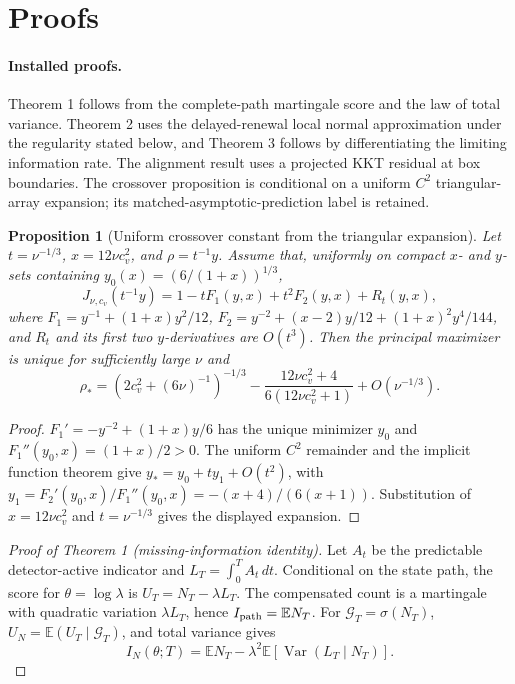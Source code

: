 \documentclass[10pt]{article}
\newtheorem{proposition}{Proposition}
\begin{document}
\section{Proofs}
\label{sec:s-proofs}
\paragraph{Installed proofs.} Theorem 1 follows from the complete-path
martingale score and the law of total variance. Theorem 2
uses the delayed-renewal local normal approximation under the regularity stated
below, and Theorem 3 follows by differentiating the limiting
information rate. The alignment result uses a projected KKT residual at box
boundaries. The crossover proposition is conditional on a uniform $C^2$
triangular-array expansion; its matched-asymptotic-prediction label is retained.

\begin{proposition}[Uniform crossover constant from the triangular expansion]
\label{prop:s-uniform-crossover}
Let $t=\nu^{-1/3}$, $x=12\nu c_v^2$, and $\rho=t^{-1}y$. Assume that,
uniformly on compact $x$- and $y$-sets containing
$y_0(x)=(6/(1+x))^{1/3}$,
\[
J_{\nu,c_v}(t^{-1}y)=1-tF_1(y,x)+t^2F_2(y,x)+R_t(y,x),
\]
where $F_1=y^{-1}+(1+x)y^2/12$, $F_2=y^{-2}+(x-2)y/12+(1+x)^2y^4/144$,
and $R_t$ and its first two $y$-derivatives are $O(t^3)$. Then the principal
maximizer is unique for sufficiently large $\nu$ and
\[
\rho_*=(2c_v^2+(6\nu)^{-1})^{-1/3}
-\frac{12\nu c_v^2+4}{6(12\nu c_v^2+1)}+O(\nu^{-1/3}).
\]
\end{proposition}

\begin{proof}
$F_1'=-y^{-2}+(1+x)y/6$ has the unique minimizer $y_0$ and
$F_1''(y_0,x)=(1+x)/2>0$. The uniform $C^2$ remainder and the implicit
function theorem give $y_*=y_0+t y_1+O(t^2)$, with
$y_1=F_2'(y_0,x)/F_1''(y_0,x)=-(x+4)/(6(x+1))$. Substitution of
$x=12\nu c_v^2$ and $t=\nu^{-1/3}$ gives the displayed expansion.
\end{proof}

\begin{proof}[Proof of Theorem 1 (missing-information identity)]
Let $A_t$ be the predictable detector-active indicator and
$L_T=\int_0^T A_t\,dt$. Conditional on the state path, the score for
$\theta=\log\lambda$ is $U_T=N_T-\lambda L_T$. The compensated count is a
martingale with quadratic variation $\lambda L_T$, hence
$I_{\rm path}=\mathbb E N_T$. For $\mathcal G_T=\sigma(N_T)$,
$U_N=\mathbb E(U_T\mid\mathcal G_T)$, and total variance gives
\[
I_N(\theta;T)=\mathbb E N_T-\lambda^2\mathbb E\!\left[\operatorname{Var}(L_T\mid N_T)\right].
\]
\end{proof}
\end{document}
